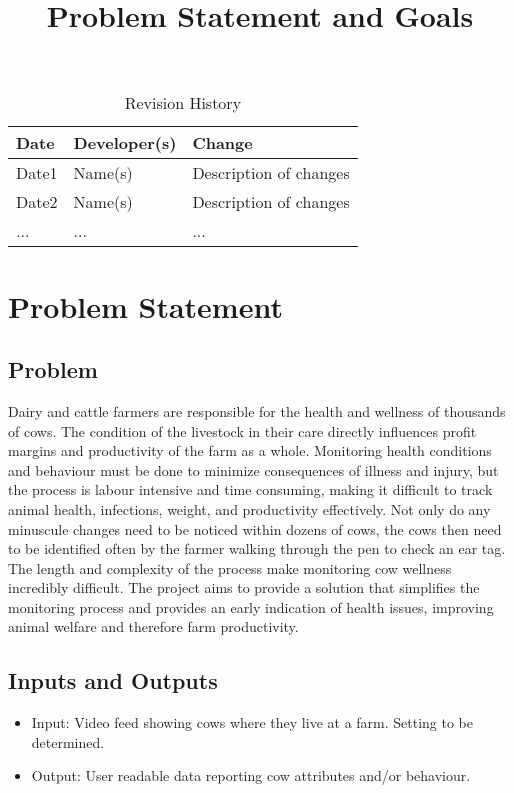 \documentclass{article}
\title{Problem Statement and Goals\\\progname}
\author{\authname}
\date{}
\begin{document}
\maketitle

\begin{table}[hp]
\caption{Revision History} \label{TblRevisionHistory}
\begin{tabularx}{\textwidth}{llX}
\toprule
\textbf{Date} & \textbf{Developer(s)} & \textbf{Change}\\
\midrule
Date1 & Name(s) & Description of changes\\
Date2 & Name(s) & Description of changes\\
... & ... & ...\\
\bottomrule
\end{tabularx}
\end{table}

\section{Problem Statement}

\subsection{Problem}
Dairy and cattle farmers are responsible for the health and wellness of thousands of cows. The condition of the livestock in their care directly influences profit margins and productivity of the farm as a whole. Monitoring health conditions and behaviour must be done to minimize consequences of illness and injury, but the process is labour intensive and time consuming, making it difficult to track animal health, infections, weight, and productivity effectively. Not only do any minuscule changes need to be noticed within dozens of cows, the cows then need to be identified often by the farmer walking through the pen to check an ear tag. The length and complexity of the process make monitoring cow wellness incredibly difficult. The project aims to provide a solution that simplifies the monitoring process and provides an early indication of health issues, improving animal welfare and therefore farm productivity. \\ 

\subsection{Inputs and Outputs}
\begin{itemize}
    \item Input: Video feed showing cows where they live at a farm. Setting to be determined.
    \item Output: User readable data reporting cow attributes and/or behaviour. 
\end{itemize} 
\end{document}
